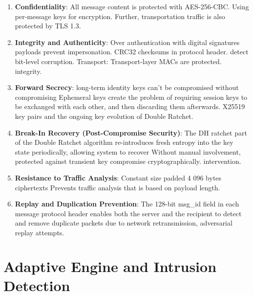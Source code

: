 \documentclass[conference]{IEEEtran}
\begin{document}
\begin{enumerate}
    \item \textbf{Confidentiality}: All message content is protected with AES-256-CBC.
          Using per-message keys for encryption.  Further, transportation traffic is also
          protected by TLS 1.3.

    \item \textbf{Integrity and Authenticity}: Over authentication with digital signatures
          payloads prevent impersonation.  CRC32 checksums in protocol header.
          detect bit-level corruption.  Transport: Transport-layer MACs are protected.
          integrity.

    \item \textbf{Forward Secrecy}: long-term identity keys can't be compromised without compromising
          Ephemeral keys create the problem of requiring session keys to be exchanged with each other, and then discarding them afterwards.
          X25519 key pairs and the ongoing key evolution of Double Ratchet.

    \item \textbf{Break-In Recovery (Post-Compromise Security)}: The DH ratchet part
          of the Double Ratchet algorithm re-introduces fresh entropy into the key
          state periodically, allowing system to recover
          Without manual involvement, protected against transient key compromise cryptographically.
          intervention.

    \item \textbf{Resistance to Traffic Analysis}: Constant size padded 4 096 bytes ciphertexts
          Prevents traffic analysis that is based on payload length.

    \item \textbf{Replay and Duplication Prevention}: The 128-bit msg\_id field in each message
          protocol header enables both the server and the recipient to detect and
          remove duplicate packets due to network retransmission,
          adversarial replay attempts.
\end{enumerate}

\section{Adaptive Engine and Intrusion Detection}
\label{sec:adaptive_engine}
\end{document}
